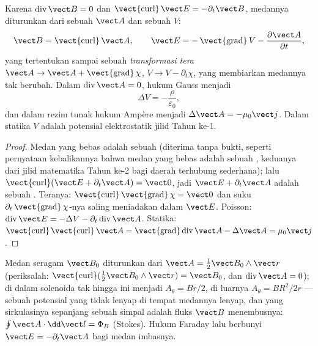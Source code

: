 \begin{proposition}\label{prop:b2:maxwell-equations:potentials}
Karena $\operatorname{div}\vect B = 0$ dan $\operatorname{\vect{curl}}\vect E = -\partial_t
\vect B$, medannya diturunkan dari sebuah \emph{} $\vect A$ dan sebuah
\emph{} $V$:
\[
\vect B = \operatorname{\vect{curl}}\vect A , \qquad
\vect E = -\operatorname{\vect{grad}}V - \frac{\partial\vect A}{\partial t} ,
\]
yang tertentukan sampai sebuah \emph{transformasi tera} $\vect A \to \vect A +
\operatorname{\vect{grad}}\chi$, $V \to V - \partial_t\chi$, yang membiarkan medannya
tak berubah. Dalam \emph{} $\operatorname{div}\vect A = 0$, hukum
Gauss menjadi \emph{}
\[
\Delta V = -\frac\rho{\varepsilon_0} ,
\]
dan dalam rezim tunak hukum Ampère menjadi $\Delta\vect A = -\mu_0\vect j$.
Dalam statika $V$ adalah potensial elektrostatik jilid Tahun ke-1.
\end{proposition}

\begin{proof}
Medan yang bebas  adalah sebuah  (diterima tanpa bukti, seperti pernyataan
kebalikannya bahwa medan yang bebas  adalah sebuah , keduanya dari jilid
matematika Tahun ke-2 bagi daerah terhubung sederhana); lalu $\operatorname{\vect{curl}}
(\vect E + \partial_t\vect A) = \vect 0$, jadi $\vect E + \partial_t\vect A$ adalah sebuah .
Teranya: $\operatorname{\vect{curl}}\operatorname{\vect{grad}}\chi = \vect 0$ dan
suku $\partial_t\operatorname{\vect{grad}}\chi$-nya saling meniadakan dalam $\vect E$. Poisson: $\operatorname{div}
\vect E = -\Delta V - \partial_t\operatorname{div}\vect A$. Statika: $\operatorname{\vect{curl}}
\operatorname{\vect{curl}}\vect A = \operatorname{\vect{grad}}\operatorname{div}\vect A - \Delta\vect A
= \mu_0\vect j$.
\end{proof}

\begin{example}\label{ex:b2:maxwell-equations:vectorpot}
Medan seragam $\vect B_0$ diturunkan dari $\vect A = \tfrac12\vect B_0\wedge\vect r$
(periksalah: $\operatorname{\vect{curl}}(\tfrac12\vect B_0\wedge\vect r) = \vect B_0$, dan
$\operatorname{div}\vect A = 0$); di dalam solenoida tak hingga ini menjadi $A_\theta =
Br/2$, di luarnya $A_\theta = BR^2/2r$ --- sebuah potensial yang tidak lenyap
di tempat medannya lenyap, dan yang sirkulasinya sepanjang sebuah simpal adalah fluks
$\vect B$ menembusnya: $\oint\vect A\cdot\dd\vect l = \Phi_B$ (Stokes). Hukum Faraday
lalu berbunyi $\vect E = -\partial_t\vect A$ bagi medan imbasnya.
\end{example}

